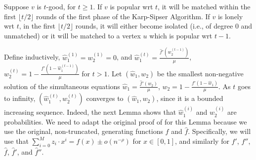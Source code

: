 \documentclass[11pt]{article}
\begin{document}
\begin{toappendix}
\begin{lemma}\label{lem:bg-3-5}
Suppose $v$ is $t$-good, for $t\geq 1$. If $v$ is popular wrt $t$, it will be matched within the first $\lfloor t/2 \rfloor$ rounds of the first phase of the Karp-Sipser Algorithm. If $v$ is lonely wrt $t$, in the first $\lfloor t/2\rfloor$ rounds, it will either become isolated (i.e., of degree $0$ and unmatched) or it will be matched to a vertex $u$ which is popular wrt $t-1$.
\end{lemma}

Define inductively, $\hat{w}_1^{(1)} = w_2^{(1)} = 0$, and $\hat{w}_1^{(t)} = \frac{\hat{f}'(w_2^{(t-1)})}{\mu}$, $w_2^{(t)} = 1 - \frac{f'(1 - \hat{w}_1^{(t-1)})}{\mu}$ for $t>1$. Let $(\hat{w}_1, w_2)$ be the smallest non-negative solution of the simultaneous equations $\hat{w}_1 = \frac{\hat{f}'(w_2)}{\mu}$, $w_2 = 1 - \frac{f'(1 - \hat{w}_1)}{\mu}$. As $t$ goes to infinity, $(\hat{w}_1^{(t)}, w_2^{(t)})$ converges to $(\hat{w}_1, w_2)$, since it is a bounded increasing sequence. Indeed, the next Lemma shows that $\hat{w}_1^{(i)}$ and ${w}_2^{(i)}$ are probabilities. We need to adapt the original proof of \cite{bg15} for this Lemma because we use the original, non-truncated, generating functions $f$ and $\hat{f}$. Specifically, we will use that $\sum_{i=0}^M z_i \cdot x^i = f(x) \pm o(n^{-\rho})$ for $x\in[0,1]$, and similarly for $f'$, $f''$, $\hat{f}$, $\hat{f}'$, and $\hat{f}''$.


\end{toappendix}
\end{document}
